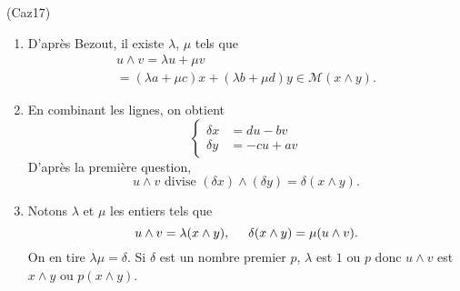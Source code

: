 \begin{tiny}(Caz17)\end{tiny} 
\begin{enumerate}
 \item D'après Bezout, il existe $\lambda$, $\mu$ tels que
\begin{multline*}
 u \wedge v = \lambda u + \mu v \\
 = (\lambda a + \mu c)x + (\lambda b + \mu d)y 
 \in \mathcal{M}(x \wedge y).
\end{multline*}

 \item En combinant les lignes, on obtient
\[
\left\lbrace  
\begin{aligned}
 \delta x &= du - bv \\ \delta y &= -cu + av
\end{aligned}
\right. 
\]
D'après la première question, 
\[
 u\wedge v \text{ divise } (\delta x) \wedge (\delta y) = \delta (x \wedge y).
\]

 \item Notons $\lambda$ et $\mu$ les entiers tels que
\[
 u \wedge v = \lambda (x\wedge y), \hspace{0.5cm} \delta (x\wedge y) = \mu (u \wedge v).
\]
On en tire $\lambda \mu = \delta$. Si $\delta$ est un nombre premier $p$, $\lambda$ est $1$ ou $p$ donc $u \wedge v$ est $x \wedge y$ ou $p(x \wedge y)$.
\end{enumerate}
